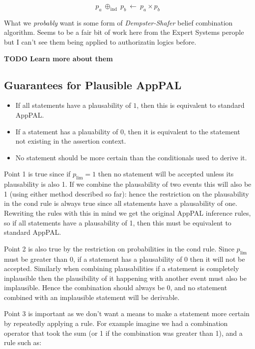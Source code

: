 \documentclass[thesis.tex]{subfiles}
\begin{document}
\begin{equation*}
  p_a~\oplus_{\text{ind}}~p_b~\gets~p_a\times p_b
\end{equation*}

What we \emph{probably} want is some form of \emph{Dempster-Shafer}
belief combination algorithm.  Seems to be a fair bit of work here
from the Expert Systems perople but I can't see them being applied to
authorizatin logics before.

\textbf{TODO Learn more about them}

\subsection{Guarantees for Plausible AppPAL} 

\begin{itemize}
\item If all statements have a plausability of $1$, then this is
  equivalent to standard AppPAL.
\item If a statement has a plauability of $0$, then it is equivalent
  to the statement not existing in the assertion context.
\item No statement should be more certain than the conditionals used
  to derive it.
\end{itemize}

Point 1 is true since if $p_{\text{lim}} = 1$ then no statement will
be accepted unless its plausability is also 1.  If we combine the
plausability of two events this will also be 1 (using either method
described so far): hence the restriction on the plausability in the
cond rule is always true since all statements have a plausability of
one.  Rewriting the rules with this in mind we get the original AppPAL
inference rules, so if all statements have a plausability of 1, then
this must be equivalent to standard AppPAL.

Point 2 is also true by the restriction on probabilities in the cond
rule.  Since $p_{\text{lim}}$ must be greater than 0, if a statement
has a plausability of 0 then it will not be accepted.  Similarly when
combining plausabilities if a statement is completely inplausible then
the plausibility of it happening with another event must also be
implausible.  Hence the combination should always be 0, and no
statement combined with an implausible statement will be derivable.

Point 3 is important as we don't want a means to make a statement more
certain by repeatedly applying a rule.  For example imagine we had a
combination operator that took the sum (or 1 if the combination was
greater than 1), and a rule such as:
\end{document}
